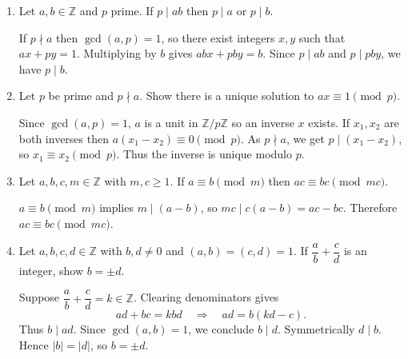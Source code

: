 \documentclass[11pt]{article}
\begin{document}
\begin{enumerate}
  \item Let $a,b\in\mathbb Z$ and $p$ prime. If $p\mid ab$ then $p\mid a$ or $p\mid b$.
  \begin{subprove}
    If $p\nmid a$ then $\gcd(a,p)=1$, so there exist integers $x,y$ such that $ax+py=1$. Multiplying by $b$ gives $abx+pby=b$. Since $p\mid ab$ and $p\mid pby$, we have $p\mid b$.

  \end{subprove}

  \item Let $p$ be prime and $p\nmid a$. Show there is a unique solution to $ax\equiv1\pmod p$.
  \begin{subprove}
    Since $\gcd(a,p)=1$, $a$ is a unit in $\mathbb Z/p\mathbb Z$ so an inverse $x$ exists. If $x_1,x_2$ are both inverses then $a(x_1-x_2)\equiv0\pmod p$. As $p\nmid a$, we get $p\mid(x_1-x_2)$, so $x_1\equiv x_2\pmod p$. Thus the inverse is unique modulo $p$.
  \end{subprove}

  \item Let $a,b,c,m\in\mathbb Z$ with $m,c\ge1$. If $a\equiv b\pmod m$ then $ac\equiv bc\pmod{mc}$.
  \begin{subprove}
    $a\equiv b\pmod m$ implies $m\mid(a-b)$, so $mc\mid c(a-b)=ac-bc$. Therefore $ac\equiv bc\pmod{mc}$.
  \end{subprove}

  \item Let $a,b,c,d\in\mathbb Z$ with $b,d\neq0$ and $(a,b)=(c,d)=1$. If $\dfrac{a}{b}+\dfrac{c}{d}$ is an integer, show $b=\pm d$.
  \begin{subprove}
    Suppose $\dfrac{a}{b}+\dfrac{c}{d}=k\in\mathbb Z$. Clearing denominators gives
    \[ad+bc=kbd\quad\Rightarrow\quad ad=b(kd-c).\]
    Thus $b\mid ad$. Since $\gcd(a,b)=1$, we conclude $b\mid d$. Symmetrically $d\mid b$. Hence $|b|=|d|$, so $b=\pm d$.
  \end{subprove}

\end{enumerate}
\end{document}
